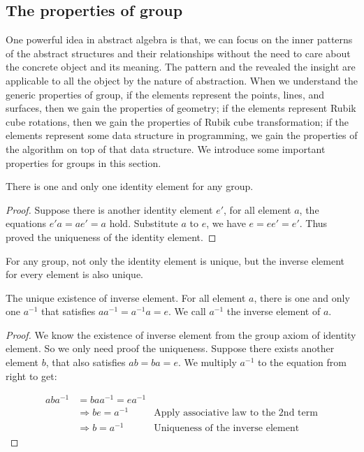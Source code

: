 \documentclass{article}
\begin{document}
\subsection{The properties of group}

One powerful idea in abstract algebra is that, we can focus on the inner patterns of the abstract structures and their relationships without the need to care about the concrete object and its meaning. The pattern and the revealed the insight are applicable to all the object by the nature of abstraction. When we understand the generic properties of group, if the elements represent the points, lines, and surfaces, then we gain the properties of geometry; if the elements represent Rubik cube rotations, then we gain the properties of Rubik cube transformation; if the elements represent some data structure in programming, we gain the properties of the algorithm on top of that data structure. We introduce some important properties for groups in this section.

\begin{theorem}
There is one and only one identity element for any group.
\end{theorem}

\begin{proof}
Suppose there is another identity element $e'$, for all element $a$, the equations $e'a = ae' = a$ hold. Substitute $a$ to $e$, we have $e = ee'= e'$. Thus proved the uniqueness of the identity element.
\end{proof}

For any group, not only the identity element is unique, but the inverse element for every element is also unique.

\begin{theorem}
The unique existence of inverse element. For all element $a$, there is one and only one $a^{-1}$ that satisfies $aa^{-1} = a^{-1}a = e$. We call $a^{-1}$ the inverse element of $a$.
\end{theorem}

\begin{proof}
We know the existence of inverse element from the group axiom of identity element. So we only need proof the uniqueness. Suppose there exists another element $b$, that also satisfies $ab = ba = e$. We multiply $a^{-1}$ to the equation from right to get:

\[
\begin{array}{rll}
aba^{-1} & = baa^{-1} = ea^{-1} & \\
& \Rightarrow be = a^{-1} & \text{Apply associative law to the 2nd term} \\
& \Rightarrow b = a^{-1} & \text{Uniqueness of the inverse element}
\end{array}
\]
\end{proof}
\end{document}
